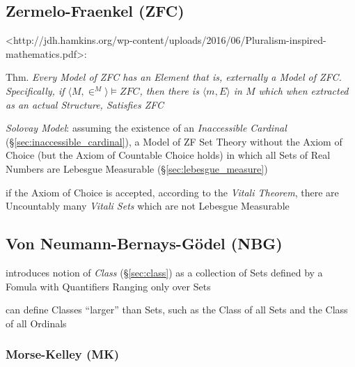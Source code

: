 \subsection{Zermelo-Fraenkel (ZFC)}\label{sec:zermelo_fraenkel}

<http://jdh.hamkins.org/wp-content/uploads/2016/06/Pluralism-inspired-mathematics.pdf>:

Thm. \emph{Every Model of ZFC has an Element that is, externally a
  Model of ZFC. Specifically, if $\langle{M,\in^M}\rangle \vDash ZFC$,
then there is $\langle{m,E}\rangle$ in $M$ which when extracted as an
actual Structure, Satisfies ZFC}

\emph{Solovay Model}: assuming the existence of an \emph{Inaccessible Cardinal}
(\S\ref{sec:inaccessible_cardinal}), a Model of ZF Set Theory without the Axiom
of Choice (but the Axiom of Countable Choice holds) in which all Sets of Real
Numbers are Lebesgue Measurable (\S\ref{sec:lebesgue_measure})

if the Axiom of Choice is accepted, according to the \emph{Vitali Theorem},
there are Uncountably many \emph{Vitali Sets} which are not Lebesgue Measurable



\subsection{Von Neumann-Bernays-G\"odel (NBG)}\label{sec:nbg_set_theory}

introduces notion of \emph{Class} (\S\ref{sec:class}) as a collection of Sets
defined by a Fomula with Quantifiers Ranging only over Sets

can define Classes ``larger'' than Sets, such as the Class of all Sets and the
Class of all Ordinals



\subsubsection{Morse-Kelley (MK)}\label{sec:mk_set_theory}



